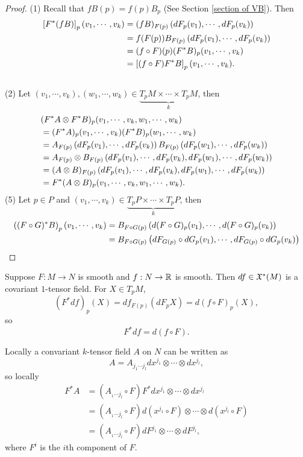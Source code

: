 \begin{proof}
    (1) Recall that $fB(p) = f(p)B_p$ (See Section \ref{section of VB}). Then 
    \begin{align*}
    \left[F^*(fB) \right]_p(v_1,\cdots,v_k)
    &= (fB)_{F(p)}\left(dF_p(v_1),\cdots,dF_p(v_k)\right) \\
    &= f(F(p))B_{F(p)}\left(dF_p(v_1),\cdots,dF_p(v_k)\right) \\
    &= (f \circ F)(p) (F^*B)_p (v_1,\cdots,v_k) \\
    &= \left[(f \circ F)F^*B\right]_p (v_1,\cdots,v_k).
    \end{align*}
    \\ 
    (2) Let $(v_1,\cdots,v_k), (w_1, \cdots, w_k) \in 
    \underbrace{T_pM \times \cdots \times T_pM}_{k}$, then 
    \begin{align*}
    &(F^*A \otimes F^*B)_p (v_1,\cdots,v_k,w_1,\cdots,w_k) \\
    &= (F^*A)_p(v_1,\cdots,v_k) (F^*B)_p(w_1,\cdots,w_k) \\
    &= A_{F(p)}\left(dF_p(v_1), \cdots, dF_p(v_k)\right)
       B_{F(p)}\left(dF_p(w_1), \cdots, dF_p(w_k)\right) \\
    &= A_{F(p)} \otimes B_{F(p)}\left(
       dF_p(v_1), \cdots, dF_p(v_k), dF_p(w_1), \cdots, dF_p(w_k)
    \right) \\
    &= (A \otimes B)_{F(p)}\left(
       dF_p(v_1), \cdots, dF_p(v_k), dF_p(w_1), \cdots, dF_p(w_k)
    \right) \\
    &= F^*(A \otimes B)_p(v_1,\cdots,v_k,w_1,\cdots,w_k). 
    \end{align*}
    (5) Let $p \in P$ and $(v_1,\cdots,v_k) \in \underbrace{T_pP \times \cdots \times T_pP}_{k}$, then 
    \begin{align*}
    \left((F \circ G)^*B\right)_p(v_1,\cdots,v_k) 
    &= B_{F \circ G(p)}\left(
    d(F \circ G)_p (v_1), \cdots, d(F \circ G)_p (v_k)
    \right) \\
    &= B_{F \circ G(p)}\left(
    dF_{G(p)} \circ dG_p(v_1), \cdots, dF_{G(p)} \circ dG_p(v_k)
    \right)
    \end{align*}
\end{proof}
\begin{example}
    Suppose $F:M \to N$ is smooth and $f:N \to \mathbb{R}$ is smooth. Then $df \in \frak{X}^*(M)$ is a covariant $1$-tensor field. For $X \in T_pM$, 
    $$(F^*df)_p(X) = df_{F(p)}(dF_p X)
    = d(f \circ F)_p(X), $$
    so $$F^*df = d(f \circ F). $$
\end{example}
\begin{example}
    Locally a convariant $k$-tensor field $A$ on $N$ can be written as 
    $$A = A_{j_1 \cdots j_l} dx^{j_1} \otimes \cdots \otimes dx^{j_l}, $$ so locally 
    \begin{align*}
    F^*A &= (A_{_1 \cdots j_l} \circ F)F^* dx^{j_1} \otimes \cdots \otimes dx^{j_l}  \\
    &= (A_{_1 \cdots j_l} \circ F)d(x^{j_1} \circ F) \otimes \cdots \otimes d(x^{j_l} \circ F) \\
    &= (A_{_1 \cdots j_l} \circ F)dF^{j_1} \otimes \cdots \otimes dF^{j_l},
    \end{align*}
    where $F^i$ is the $i$th component of $F$. 
\end{example}


